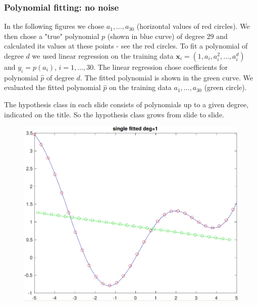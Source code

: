 \subsubsection{Polynomial fitting: no noise}
    In the following figures we chose $a_1,\ldots,a_{30}$ (horizontal values of red circles). We then chose a "true" polynomial $p$ (shown in blue curve) of degree 29 and calculated its values at these points - see the red
    circles. To fit a polynomial of degree $d$ we used linear regression on the training data $\mathbf{x}_i=(1,a_i,a_i^2,\ldots,a_i^d)$ and $y_i=p(a_i)$,  $i=1,\ldots,30$. The linear regression chose coefficients for polynomial $\hat{p}$ of degree $d$. The fitted polynomial is shown in the green curve. We evaluated the fitted polynomial $\hat{p}$ on the training data $a_1,\ldots,a_{30}$ (green circle).

 The hypothesis class in each slide consists of polynomials up to a given degree, indicated on the title. So the hypothesis class grows from slide to slide.

\newpage
\begin{figure}[h!]
\centering\includegraphics[scale=0.3]{clean_poly_d_1.png}
\end{figure}


